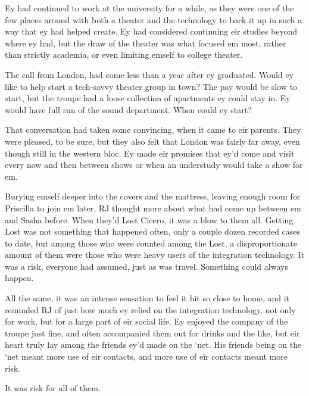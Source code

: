 Ey had continued to work at the university for a while, as they were one of the few places around with both a theater and the technology to back it up in such a way that ey had helped create. Ey had considered continuing eir studies beyond where ey had, but the draw of the theater was what focused em most, rather than strictly academia, or even limiting emself to college theater.

The call from London, had come less than a year after ey graduated. Would ey like to help start a tech-savvy theater group in town? The pay would be slow to start, but the troupe had a loose collection of apartments ey could stay in. Ey would have full run of the sound department. When could ey start?

That conversation had taken some convincing, when it came to eir parents. They were pleased, to be sure, but they also felt that London was fairly far away, even though still in the western bloc. Ey made eir promises that ey'd come and visit every now and then between shows or when an understudy would take a show for em.

Burying emself deeper into the covers and the mattress, leaving enough room for Priscilla to join em later, RJ thought more about what had come up between em and Sasha before. When they'd Lost Cicero, it was a blow to them all. Getting Lost was not something that happened often, only a couple dozen recorded cases to date, but among those who were counted among the Lost, a disproportionate amount of them were those who were heavy users of the integration technology. It was a risk, everyone had assumed, just as was travel. Something could always happen.

All the same, it was an intense sensation to feel it hit so close to home, and it reminded RJ of just how much ey relied on the integration technology, not only for work, but for a large part of eir social life. Ey enjoyed the company of the troupe just fine, and often accompanied them out for drinks and the like, but eir heart truly lay among the friends ey'd made on the `net. His friends being on the `net meant more use of eir contacts, and more use of eir contacts meant more risk.

It was risk for all of them.
